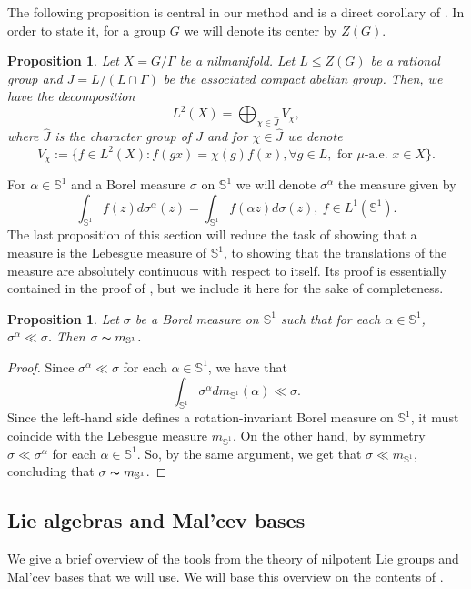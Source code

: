 \documentclass[letter, 11pt]{article}
\newtheorem{proposition}[theorem]{Proposition}
\theoremstyle{definition}
\theoremstyle{plain}
\newcommand{\bS}{\mathbb{S}}
\newcommand{\1}{\mathbbm{1}}
\begin{document}
The following proposition is central in our method and is a direct corollary of \cite[Lemma~1]{Parry}. In order to state it, for a group $G$ we will denote its center by $Z(G)$.
\begin{proposition}\label{PW}
    Let $X=G/\Gamma$ be a nilmanifold. Let $L\leq Z(G)$ be a rational group and $J=L/(L\cap \Gamma)$ be the associated compact abelian group. Then, we have the decomposition 
    $$L^2(X)=\bigoplus_{\chi\in \widehat{J}}V_\chi, $$
    where $\widehat{J}$ is the character group of $J$ and for $\chi\in \widehat{J}$ we denote 
    \begin{equation}\label{def-V-chi}
       V_\chi:=\{ f\in L^2(X) : f(gx)= \chi(g)f(x), \forall g\in L, \text{ for }\mu\text{-a.e. } x\in X\}.  
    \end{equation}
\end{proposition}
For $\alpha\in \bS^1$ and a Borel measure $\sigma$ on $\bS^1$ we will denote $\sigma^\alpha$ the measure given by 
$$\int_{\bS^1} f(z) d\sigma^\alpha(z)=\int_{\bS^1} f(\alpha z) d\sigma(z),~ f\in L^1(\bS^1).  $$
The last proposition of this section will reduce the task of showing that a measure is the Lebesgue measure of $\bS^1$, to showing that the translations of the measure are absolutely continuous with respect to itself. Its proof is essentially contained in the proof of \cite[Proposition 3.2]{MR4797105}, but we include it here for the sake of completeness.
\begin{proposition}\label{Lemma-measure-in-circle}
    Let $\sigma$ be a Borel measure on $\bS^1$ such that for each $\alpha\in \bS^1$, $\sigma^\alpha\ll \sigma$. Then $\sigma\thicksim m_{\bS^1}$.
\end{proposition}
\begin{proof}
    Since $\sigma^\alpha\ll \sigma$ for each $\alpha\in \bS^1$, we have that 
    $$\int_{\bS^1} \sigma^\alpha dm_{\bS^1}(\alpha) \ll \sigma.  $$
    Since the left-hand side defines a rotation-invariant Borel measure on $\bS^1$, it must coincide with the Lebesgue measure $m_{\bS^1}$. On the other hand, by symmetry $\sigma\ll \sigma^\alpha$ for each $\alpha\in \bS^1$. So, by the same argument, we get that $\sigma \ll m_{\bS^1}$, concluding that $\sigma \thicksim  m_{\bS^1}$.
\end{proof}
\subsection{Lie algebras and Mal'cev bases}
We give a brief overview of the tools from the theory of nilpotent Lie groups and Mal'cev bases that we will use. We will base this overview on the contents of \cite[Chapter 10, sections 1.7 and 4.1]{Host_Kra_nilpotent_structures_ergodic_theory:2018}.
\end{document}
